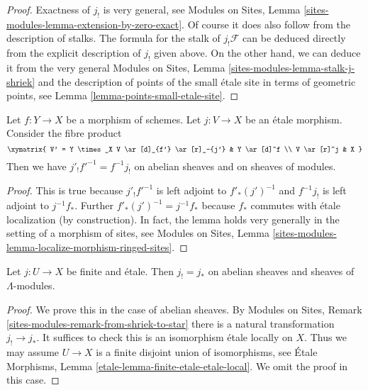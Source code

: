 \begin{proof}
Exactness of $j_!$ is very general, see Modules on Sites, 
Lemma \ref{sites-modules-lemma-extension-by-zero-exact}.
Of course it does also follow from the description of stalks.
The formula for the stalk of $j_!\mathcal{F}$ can be deduced
directly from the explicit description of $j_!$ given above.
On the other hand, we can deduce it from the very general
Modules on Sites, Lemma \ref{sites-modules-lemma-stalk-j-shriek}
and the description of points of the small \'etale site
in terms of geometric points, see
Lemma \ref{lemma-points-small-etale-site}.
\end{proof}

\begin{lemma}
\label{lemma-shriek-base-change}
Let $f: Y \to X$ be a morphism of schemes. Let $j: V \to X$ be an \'etale
morphism. Consider the fibre product
$$
\xymatrix{
V' = Y \times_X V \ar[d]_{f'} \ar[r]_-{j'} & Y \ar[d]^f \\
V \ar[r]^j & X
}
$$
Then we have $j'_! f'^{-1} = f^{-1} j_!$ on abelian sheaves and on
sheaves of modules.
\end{lemma}

\begin{proof}
This is true because $j'_! f'^{-1}$ is left adjoint to
$f'_* (j')^{-1}$ and $f^{-1} j_!$ is left adjoint to $j^{-1}f_*$.
Further $f'_* (j')^{-1} = j^{-1}f_*$ because $f_*$ commutes with
\'etale localization (by construction). In fact, the lemma holds very generally
in the setting of a morphism of sites, see
Modules on Sites, Lemma
\ref{sites-modules-lemma-localize-morphism-ringed-sites}.
\end{proof}

\begin{lemma}
\label{lemma-shriek-equals-star-finite-etale}
Let $j : U \to X$ be finite and \'etale. Then $j_! = j_*$
on abelian sheaves and sheaves of $\Lambda$-modules.
\end{lemma}

\begin{proof}
We prove this in the case of abelian sheaves.
By Modules on Sites, Remark \ref{sites-modules-remark-from-shriek-to-star}
there is a natural transformation $j_! \to j_*$.
It suffices to check this is an isomorphism \'etale locally
on $X$. Thus we may assume $U \to X$ is a finite disjoint union
of isomorphisms, see
\'Etale Morphisms, Lemma \ref{etale-lemma-finite-etale-etale-local}.
We omit the proof in this case.
\end{proof}


